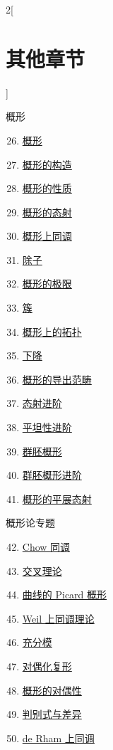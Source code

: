 \begin{multicols}{2}[\section{其他章节}]
\begin{enumerate}
\end{enumerate}
概形
\begin{enumerate}
\setcounter{enumi}{25}
\item \hyperref[schemes-section-phantom]{概形}
\item \hyperref[constructions-section-phantom]{概形的构造}
\item \hyperref[properties-section-phantom]{概形的性质}
\item \hyperref[morphisms-section-phantom]{概形的态射}
\item \hyperref[coherent-section-phantom]{概形上同调}
\item \hyperref[divisors-section-phantom]{除子}
\item \hyperref[limits-section-phantom]{概形的极限}
\item \hyperref[varieties-section-phantom]{簇}
\item \hyperref[topologies-section-phantom]{概形上的拓扑}
\item \hyperref[descent-section-phantom]{下降}
\item \hyperref[perfect-section-phantom]{概形的导出范畴}
\item \hyperref[more-morphisms-section-phantom]{态射进阶}
\item \hyperref[flat-section-phantom]{平坦性进阶}
\item \hyperref[groupoids-section-phantom]{群胚概形}
\item \hyperref[more-groupoids-section-phantom]{群胚概形进阶}
\item \hyperref[etale-section-phantom]{概形的平展态射}
\end{enumerate}
概形论专题
\begin{enumerate}
\setcounter{enumi}{41}
\item \hyperref[chow-section-phantom]{Chow 同调}
\item \hyperref[intersection-section-phantom]{交叉理论}
\item \hyperref[pic-section-phantom]{曲线的 Picard 概形}
\item \hyperref[weil-section-phantom]{Weil 上同调理论}
\item \hyperref[adequate-section-phantom]{充分模}
\item \hyperref[dualizing-section-phantom]{对偶化复形}
\item \hyperref[duality-section-phantom]{概形的对偶性}
\item \hyperref[discriminant-section-phantom]{判别式与差异}
\item \hyperref[derham-section-phantom]{de Rham 上同调}

\end{enumerate}
\end{multicols}
